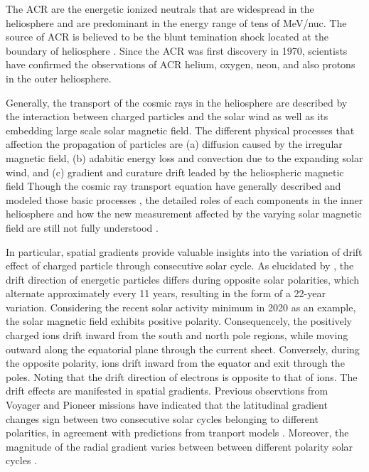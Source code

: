 The \ac{ACR} are the energetic ionized neutrals that are widespread in the heliosphere and are predominant in the energy range of tens of MeV/nuc. The source of \ac{ACR} is believed to be the blunt temination shock located at the boundary of heliosphere \citep{McComas2006GeoRL}. Since the \ac{ACR} was first discovery in 1970, scientists have confirmed the observations of \ac{ACR} helium, oxygen, neon, and also protons in the outer heliosphere. \citep{Garcia1973ICRC,Hoverstadt1973PhRvL,McDonald1974ApJ,Potgieter2013LRSP}

Generally, the transport of the cosmic rays in the heliosphere are described by the interaction between charged particles and the solar wind as well as its embedding large scale solar magnetic field. The different physical processes that affection the propagation of particles are (a) diffusion caused by the irregular magnetic field, (b) adabitic energy loss and convection due to the expanding solar wind, and (c) gradient and curature drift leaded by the heliospheric magnetic field
Though the cosmic ray transport equation have generally described and modeled those basic processes \citep{Parker1965Pss,Jokipii1977ApJ,Jokipii1981ApJ,McDonald2001ICRC}, the detailed roles of each components in the inner heliosphere and how the new measurement affected by the varying solar magnetic field are still not fully understood \citep{Rankin2021ApJ}.

In particular, spatial gradients provide valuable insights into the variation of drift effect of charged particle through consecutive solar cycle. As elucidated by \citet{Jokipii1977ApJ, Jokipii1979ApJ, Potgieter2013LRSP}, the drift direction of energetic particles differs during opposite solar polarities, which alternate approximately every 11 years, resulting in the form of a 22-year variation. Considering the recent solar activity minimum in 2020 as an example, the solar magnetic field exhibits positive polarity. Consequencely, the positively charged ions drift inward from the south and north pole regions, while moving outward along the equatorial plane through the current sheet. Conversely, during the opposite polarity, ions drift inward from the equator and exit through the poles. Noting that the drift direction of electrons is opposite to that of ions. The drift effects are manifested in spatial gradients. Previous observtions from Voyager and Pioneer missions have indicated that the latitudinal gradient changes sign between two consecutive solar cycles belonging to different polarities, in agreement with predictions from tranport models \citep{Mckibben1979ApJ, Cummings1987GeoRL, Christon1986JGR}. Moreover, the magnitude of the radial gradient varies between between different polarity solar cycles \citep{Rankin2021ApJ,Rankin2022ApJ,Giacalone2022SSRv,Webber1981JGR,Marsden1999AdSpR}.

